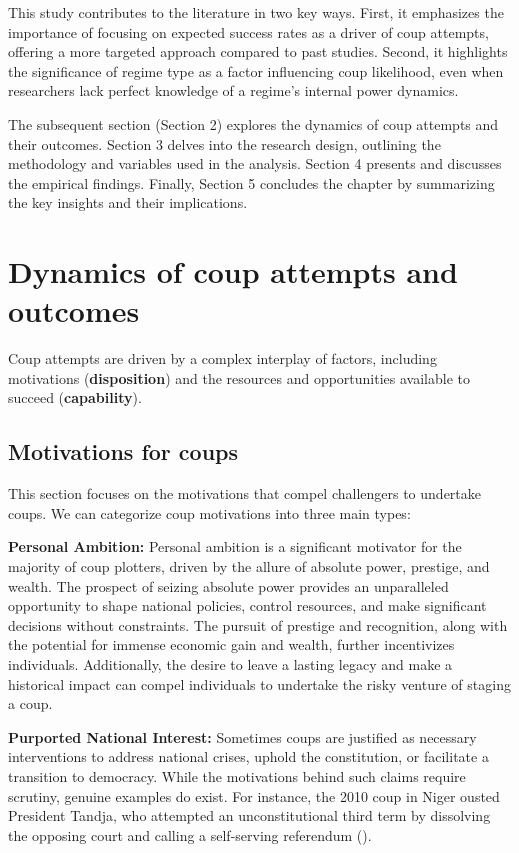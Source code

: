 \documentclass[
  12pt,
]{report}
\begin{document}
This study contributes to the literature in two key ways. First, it
emphasizes the importance of focusing on expected success rates as a
driver of coup attempts, offering a more targeted approach compared to
past studies. Second, it highlights the significance of regime type as a
factor influencing coup likelihood, even when researchers lack perfect
knowledge of a regime's internal power dynamics.

The subsequent section (Section 2) explores the dynamics of coup
attempts and their outcomes. Section 3 delves into the research design,
outlining the methodology and variables used in the analysis. Section 4
presents and discusses the empirical findings. Finally, Section 5
concludes the chapter by summarizing the key insights and their
implications.

\section{Dynamics of coup attempts and
outcomes}\label{dynamics-of-coup-attempts-and-outcomes}

Coup attempts are driven by a complex interplay of factors, including
motivations (\textbf{disposition}) and the resources and opportunities
available to succeed (\textbf{capability}).

\subsection{Motivations for coups}\label{motivations-for-coups}

This section focuses on the motivations that compel challengers to
undertake coups. We can categorize coup motivations into three main
types:

\textbf{Personal Ambition:} Personal ambition is a significant motivator
for the majority of coup plotters, driven by the allure of absolute
power, prestige, and wealth. The prospect of seizing absolute power
provides an unparalleled opportunity to shape national policies, control
resources, and make significant decisions without constraints. The
pursuit of prestige and recognition, along with the potential for
immense economic gain and wealth, further incentivizes individuals.
Additionally, the desire to leave a lasting legacy and make a historical
impact can compel individuals to undertake the risky venture of staging
a coup.

\textbf{Purported National Interest:} Sometimes coups are justified as
necessary interventions to address national crises, uphold the
constitution, or facilitate a transition to democracy. While the
motivations behind such claims require scrutiny, genuine examples do
exist. For instance, the 2010 coup in Niger ousted President Tandja, who
attempted an unconstitutional third term by dissolving the opposing
court and calling a self-serving referendum
().
\end{document}
